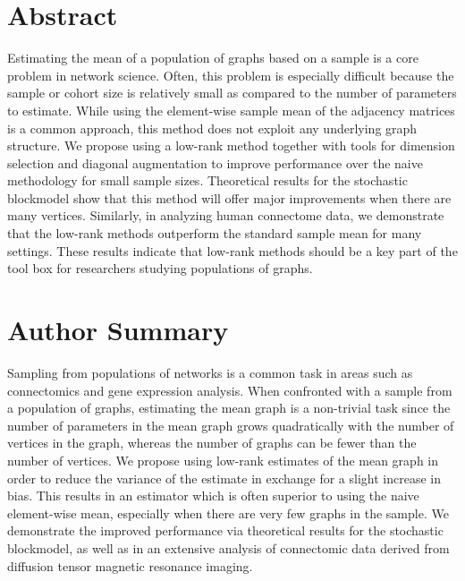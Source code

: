 \documentclass[10pt,letterpaper]{article}
\begin{document}
\section*{Abstract}
Estimating the mean of a population of graphs based on a sample is a core problem in network science.
Often, this problem is especially difficult because the sample or cohort size is relatively small as compared to the number of parameters to estimate. 
While using the element-wise sample mean of the adjacency matrices is a common approach, this method does not exploit any underlying graph structure.
We propose using a low-rank method together with tools for dimension selection and diagonal augmentation to improve performance over the naive methodology for small sample sizes.
Theoretical results for the stochastic blockmodel show that this method will offer major improvements when there are many vertices.
Similarly, in analyzing human connectome data, we demonstrate that the low-rank methods outperform the standard sample mean for many settings.
These results indicate that low-rank methods should be a key part of the tool box for researchers studying populations of graphs.



\section*{Author Summary}
Sampling from populations of networks is a common task in areas such as connectomics and gene expression analysis.
When confronted with a sample from a population of graphs, estimating the mean graph is a non-trivial task since the number of parameters in the mean graph grows quadratically with the number of vertices in the graph, whereas the number of graphs can be fewer than the number of vertices.
We propose using low-rank estimates of the mean graph in order to reduce the variance of the estimate in exchange for a slight increase in bias.
This results in an estimator which is often superior to using the naive element-wise mean, especially when there are very few graphs in the sample.
We demonstrate the improved performance via theoretical results for the stochastic blockmodel, as well as in an extensive analysis of connectomic data derived from diffusion tensor magnetic resonance imaging.

\linenumbers
\end{document}
